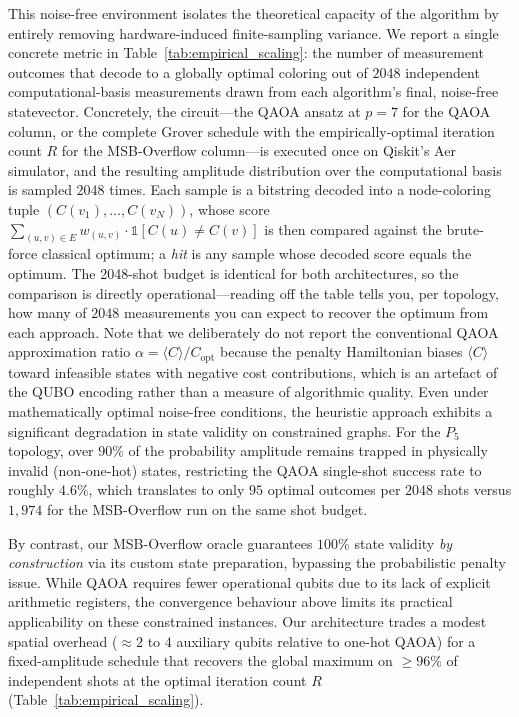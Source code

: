 \documentclass{ieeeaccess}
\begin{document}
This noise-free environment isolates the theoretical capacity of the algorithm by entirely removing hardware-induced finite-sampling variance. We report a single concrete metric in Table~\ref{tab:empirical_scaling}: the number of measurement outcomes that decode to a globally optimal coloring out of $2048$ independent computational-basis measurements drawn from each algorithm's final, noise-free statevector. Concretely, the circuit---the QAOA ansatz at $p=7$ for the QAOA column, or the complete Grover schedule with the empirically-optimal iteration count $R$ for the MSB-Overflow column---is executed once on Qiskit's Aer simulator, and the resulting amplitude distribution over the computational basis is sampled $2048$ times. Each sample is a bitstring decoded into a node-coloring tuple $(C(v_1), \dots, C(v_N))$, whose score $\sum_{(u,v) \in E} w_{(u,v)} \cdot \mathbb{1}[C(u){\ne}C(v)]$ is then compared against the brute-force classical optimum; a \emph{hit} is any sample whose decoded score equals the optimum. The 2048-shot budget is identical for both architectures, so the comparison is directly operational---reading off the table tells you, per topology, how many of $2048$ measurements you can expect to recover the optimum from each approach. Note that we deliberately do not report the conventional QAOA approximation ratio $\alpha = \langle C \rangle / C_{\mathrm{opt}}$ because the penalty Hamiltonian biases $\langle C \rangle$ toward infeasible states with negative cost contributions, which is an artefact of the QUBO encoding rather than a measure of algorithmic quality. Even under mathematically optimal noise-free conditions, the heuristic approach exhibits a significant degradation in state validity on constrained graphs. For the $P_5$ topology, over 90\% of the probability amplitude remains trapped in physically invalid (non-one-hot) states, restricting the QAOA single-shot success rate to roughly $4.6\%$, which translates to only $95$ optimal outcomes per $2048$ shots versus $1{,}974$ for the MSB-Overflow run on the same shot budget.

By contrast, our MSB-Overflow oracle guarantees $100\%$ state validity \textit{by construction} via its custom state preparation, bypassing the probabilistic penalty issue. While QAOA requires fewer operational qubits due to its lack of explicit arithmetic registers, the convergence behaviour above limits its practical applicability on these constrained instances. Our architecture trades a modest spatial overhead ($\approx 2$ to $4$ auxiliary qubits relative to one-hot QAOA) for a fixed-amplitude schedule that recovers the global maximum on $\ge 96\%$ of independent shots at the optimal iteration count $R$ (Table~\ref{tab:empirical_scaling}).
\end{document}
